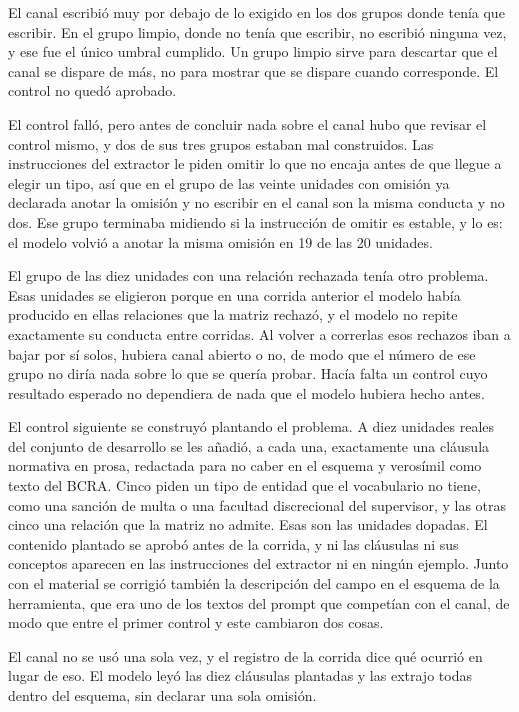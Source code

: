 \documentclass[12pt,a4paper]{report}
\begin{document}
El canal escribió muy por debajo de lo exigido en los dos grupos donde tenía que escribir. En el grupo limpio, donde no tenía que escribir, no escribió ninguna vez, y ese fue el único umbral cumplido. Un grupo limpio sirve para descartar que el canal se dispare de más, no para mostrar que se dispare cuando corresponde. El control no quedó aprobado.

El control falló, pero antes de concluir nada sobre el canal hubo que revisar el control mismo, y dos de sus tres grupos estaban mal construidos. Las instrucciones del extractor le piden omitir lo que no encaja antes de que llegue a elegir un tipo, así que en el grupo de las veinte unidades con omisión ya declarada anotar la omisión y no escribir en el canal son la misma conducta y no dos. Ese grupo terminaba midiendo si la instrucción de omitir es estable, y lo es: el modelo volvió a anotar la misma omisión en 19 de las 20 unidades.

El grupo de las diez unidades con una relación rechazada tenía otro problema. Esas unidades se eligieron porque en una corrida anterior el modelo había producido en ellas relaciones que la matriz rechazó, y el modelo no repite exactamente su conducta entre corridas. Al volver a correrlas esos rechazos iban a bajar por sí solos, hubiera canal abierto o no, de modo que el número de ese grupo no diría nada sobre lo que se quería probar. Hacía falta un control cuyo resultado esperado no dependiera de nada que el modelo hubiera hecho antes.

El control siguiente se construyó plantando el problema. A diez unidades reales del conjunto de desarrollo se les añadió, a cada una, exactamente una cláusula normativa en prosa, redactada para no caber en el esquema y verosímil como texto del BCRA. Cinco piden un tipo de entidad que el vocabulario no tiene, como una sanción de multa o una facultad discrecional del supervisor, y las otras cinco una relación que la matriz no admite. Esas son las unidades dopadas. El contenido plantado se aprobó antes de la corrida, y ni las cláusulas ni sus conceptos aparecen en las instrucciones del extractor ni en ningún ejemplo. Junto con el material se corrigió también la descripción del campo en el esquema de la herramienta, que era uno de los textos del prompt que competían con el canal, de modo que entre el primer control y este cambiaron dos cosas.

El canal no se usó una sola vez, y el registro de la corrida dice qué ocurrió en lugar de eso. El modelo leyó las diez cláusulas plantadas y las extrajo todas dentro del esquema, sin declarar una sola omisión.
\end{document}
